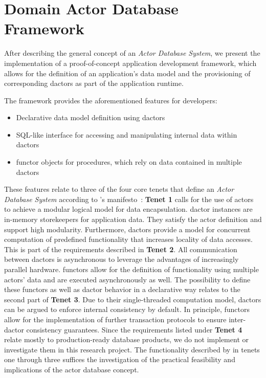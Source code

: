 
\section{Domain Actor Database Framework}\label{sec:framework}

After describing the general concept of an \textit{Actor Database System}, we present the implementation of a proof-of-concept application development framework, which allows for the definition of an application's data model and the provisioning of corresponding \glspl{dactor} as part of the application runtime.

The framework provides the aforementioned features for developers:
\begin{itemize}
  \item Declarative data model definition using \glspl{dactor}
  \item SQL-like interface for accessing and manipulating internal data within \glspl{dactor}
  \item \Gls{functor} objects for procedures, which rely on data contained in multiple \glspl{dactor}
\end{itemize}

These features relate to three of the four core tenets that define an \textit{Actor Database System} according to \citeauthor{manifesto}'s manifesto~\cite{manifesto}:
\textbf{Tenet 1} calls for the use of actors to achieve a modular logical model for data encapsulation.
\Gls{dactor} instances are in-memory storekeepers for application data.
They satisfy the actor definition and support high modularity.
Furthermore, \glspl{dactor} provide a model for concurrent computation of predefined functionality that increases locality of data accesses.
This is part of the requirements described in \textbf{Tenet 2}.
All communication between \glspl{dactor} is asynchronous to leverage the advantages of increasingly parallel hardware.
\Glspl{functor} allow for the definition of functionality using multiple actors' data and are executed asynchronously as well.
The possibility to define these \glspl{functor} as well as \gls{dactor} behavior in a declarative way relates to the second part of \textbf{Tenet 3}.
Due to their single-threaded computation model, \glspl{dactor} can be argued to enforce internal consistency by default.
In principle, \glspl{functor} allow for the implementation of further transaction protocols to ensure inter-\gls{dactor} consistency guarantees.
Since the requirements listed under \textbf{Tenet 4} relate mostly to production-ready database products, we do not implement or investigate them in this research project.
The functionality described by \citeauthor{manifesto} in tenets one through three suffices the investigation of the practical feasibility and implications of the actor database concept.

